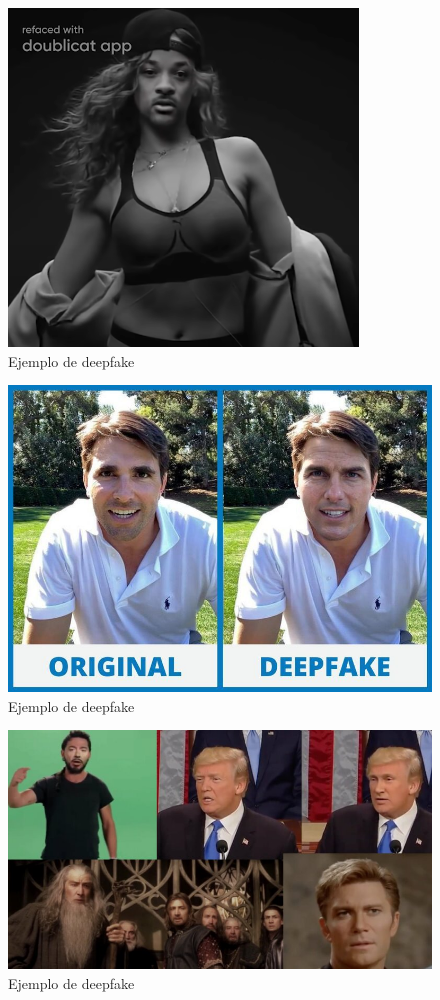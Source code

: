 \documentclass[runningheads]{llncs} %
\begin{document}
\begin{figure}
    \centering
    \includegraphics[scale=0.6]{ej2-deepfake.png}
    \caption{Ejemplo de deepfake \cite{ej-deepfake3}}
    \label{fig:deepfake-ej2}
\end{figure}

\begin{figure}
    \centering
    \includegraphics[scale=0.4]{ej3-deepfake.jpeg}
    \caption{Ejemplo de deepfake \cite{img-deepfake}}
    \label{fig:deepfake-ej3}
\end{figure}

\begin{figure}
    \centering
    \includegraphics[scale=0.4]{ej4-deepfake.jpg}
    \caption{Ejemplo de deepfake \cite{ej-deepfake1}}
    \label{fig:deepfake-ej4}
\end{figure}
\end{document}
